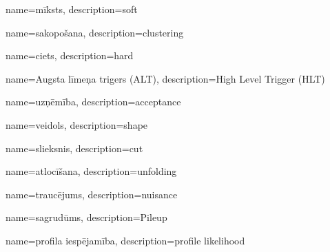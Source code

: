 {
        name=mīksts,
        description={soft}
}

{
        name=sakopošana,
        description={clustering}
}

{
        name=ciets,
        description={hard}
}

{
        name=Augsta līmeņa trigers (ALT),
        description={High Level Trigger (HLT)}
}


{
        name=uzņēmība,
        description={acceptance}
}

{
        name=veidols,
        description={shape}
}

{
        name=slieksnis,
        description={cut}
}

{
        name=atlocīšana,
        description={unfolding}
}

{
        name=traucējums,
        description={nuisance}
}

{
        name=sagrudūms,
        description={Pileup}
}

{
        name=profila iespējamība,
        description={profile likelihood}
}
